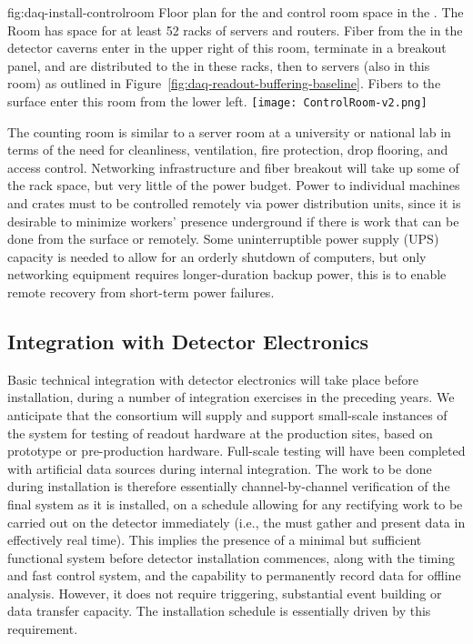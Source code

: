 \begin{dunefigure}{fig:daq-install-controlroom}
  {Floor plan for the  and control room space in the .  The 
    Room has space for at least \num{52} racks of servers and routers.
    Fiber from the  in the detector caverns enter in the upper
    right of this room, terminate in a breakout panel, and are
    distributed to the  in these racks, then to  servers (also
    in this room) as outlined in
    Figure~\ref{fig:daq-readout-buffering-baseline}.  Fibers to the
    surface enter this room from the lower left.}
\texttt{[image: ControlRoom-v2.png]}
\end{dunefigure}

The counting room is similar to a server room at a university or national lab in terms of the need for cleanliness, ventilation, fire protection, drop flooring, and access control. Networking infrastructure and fiber breakout will take up some of the rack space, but %
very little of the power budget. Power to individual machines and crates must to be controlled remotely via power distribution units, since it is desirable to minimize  workers' presence underground if there is work that can be done from the surface or remotely.  Some uninterruptible power supply (UPS) capacity is needed to allow for an orderly shutdown of computers, but only networking equipment requires longer-duration backup power, this is to enable remote recovery from short-term power failures.  

\subsection{Integration with Detector Electronics}
\label{sec:fdsp-daq-install-transport}

Basic technical integration with detector electronics will take place before installation, during a number of integration exercises in the preceding years. We anticipate that the consortium will supply and support small-scale instances of the  system for testing of readout hardware at the production sites, based on prototype or pre-production hardware. Full-scale  testing will have been completed with artificial data sources during internal integration. The work to be done during installation is therefore essentially channel-by-channel verification of the final system as it is installed, on a schedule allowing for any rectifying work to be carried out on the detector immediately (i.e., the  must gather and present data in effectively real time). This implies the presence of a minimal but sufficient functional  system before detector installation commences, along with the timing and fast control system, and the capability to permanently record data for offline analysis. However, it does not require triggering, substantial event building or data transfer capacity. The  installation schedule is essentially driven by this requirement.

